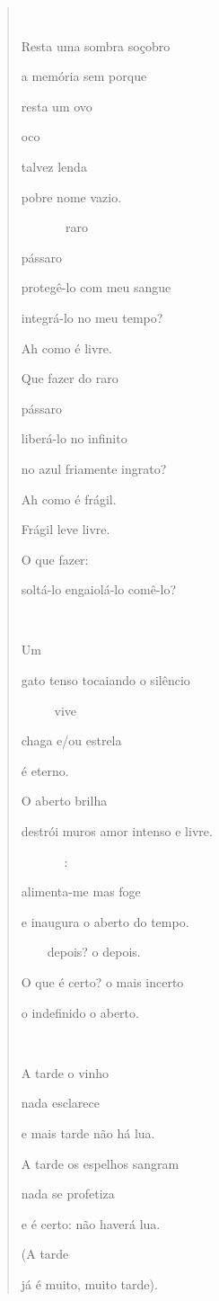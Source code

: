 \begin{quote}


Resta uma sombra soçobro

a memória sem porque

resta um ovo

oco

talvez lenda

pobre nome vazio.

   raro

pássaro

protegê-lo com meu sangue

integrá-lo no meu tempo?

Ah como é livre.

Que fazer do raro

pássaro

liberá-lo no infinito

no azul friamente ingrato?

Ah como é frágil.

Frágil leve livre.

O que fazer:

soltá-lo engaiolá-lo comê-lo?

 

Um

gato tenso tocaiando o silêncio

  vive

chaga e/ou estrela

é eterno.

O aberto brilha

destrói muros amor intenso e livre.

 : 

alimenta-me mas foge

e inaugura o aberto do tempo.

  depois? o depois.

O que é certo? o mais incerto

o indefinido o aberto.



A tarde o vinho

nada esclarece

e mais tarde não há lua.

A tarde os espelhos sangram

nada se profetiza

e é certo: não haverá lua.

(A tarde

já é muito, muito tarde).


\end{quote}
